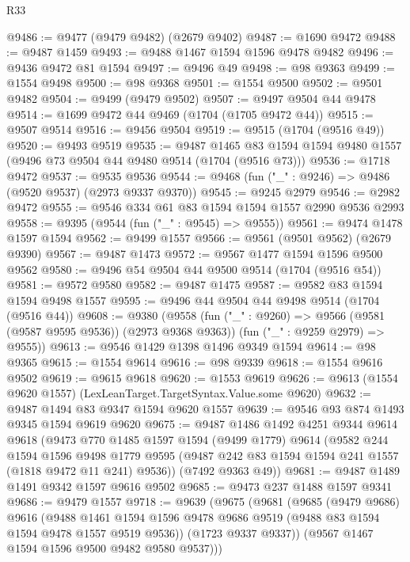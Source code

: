 \begin{lexlean}{R33}
\begin{coremodule}
@9486 := @9477 (@9479 @9482) (@2679 @9402)
@9487 := @1690 @9472
@9488 := @9487 @1459
@9493 := @9488 @1467 @1594 @1596 @9478 @9482
@9496 := @9436 @9472 @81 @1594
@9497 := @9496 @49
@9498 := @98 @9363
@9499 := @1554 @9498
@9500 := @98 @9368
@9501 := @1554 @9500
@9502 := @9501 @9482
@9504 := @9499 (@9479 @9502)
@9507 := @9497 @9504 @44 @9478
@9514 := @1699 @9472 @44 @9469 (@1704 (@1705 @9472 @44))
@9515 := @9507 @9514
@9516 := @9456 @9504
@9519 := @9515 (@1704 (@9516 @49))
@9520 := @9493 @9519
@9535 := @9487
    @1465
    @83
    @1594
    @1594
    @9480
    @1557
    (@9496 @73 @9504 @44 @9480 @9514 (@1704 (@9516 @73)))
@9536 := @1718 @9472
@9537 := @9535 @9536
@9544 := @9468 (fun ("_" : @9246) => @9486 (@9520 @9537) (@2973 @9337 @9370))
@9545 := @9245 @2979
@9546 := @2982 @9472
@9555 := @9546 @334 @61 @83 @1594 @1594 @1557 @2990 @9536 @2993
@9558 := @9395 (@9544 (fun ("_" : @9545) => @9555))
@9561 := @9474 @1478 @1597 @1594
@9562 := @9499 @1557
@9566 := @9561 (@9501 @9562) (@2679 @9390)
@9567 := @9487 @1473
@9572 := @9567 @1477 @1594 @1596 @9500 @9562
@9580 := @9496 @54 @9504 @44 @9500 @9514 (@1704 (@9516 @54))
@9581 := @9572 @9580
@9582 := @9487 @1475
@9587 := @9582 @83 @1594 @1594 @9498 @1557
@9595 := @9496 @44 @9504 @44 @9498 @9514 (@1704 (@9516 @44))
@9608 := @9380
    (@9558
      (fun ("_" : @9260) => @9566 (@9581 (@9587 @9595 @9536)) (@2973 @9368 @9363))
      (fun ("_" : @9259 @2979) => @9555))
@9613 := @9546 @1429 @1398 @1496 @9349 @1594
@9614 := @98 @9365
@9615 := @1554 @9614
@9616 := @98 @9339
@9618 := @1554 @9616 @9502
@9619 := @9615 @9618
@9620 := @1553 @9619
@9626 := @9613 (@1554 @9620 @1557) (LexLeanTarget.TargetSyntax.Value.some @9620)
@9632 := @9487 @1494 @83 @9347 @1594 @9620 @1557
@9639 := @9546 @93 @874 @1493 @9345 @1594 @9619 @9620
@9675 := @9487
    @1486
    @1492
    @4251
    @9344
    @9614
    @9618
    (@9473
      @770
      @1485
      @1597
      @1594
      (@9499 @1779)
      @9614
      (@9582
        @244
        @1594
        @1596
        @9498
        @1779
        @9595
        (@9487 @242 @83 @1594 @1594 @241 @1557 (@1818 @9472 @11 @241) @9536))
      (@7492 @9363 @49))
@9681 := @9487 @1489 @1491 @9342 @1597 @9616 @9502
@9685 := @9473 @237 @1488 @1597 @9341
@9686 := @9479 @1557
@9718 := @9639
    (@9675
      (@9681
        (@9685
          (@9479 @9686)
          @9616
          (@9488
            @1461
            @1594
            @1596
            @9478
            @9686
            @9519
            (@9488 @83 @1594 @1594 @9478 @1557 @9519 @9536))
          (@1723 @9337 @9337))
        (@9567 @1467 @1594 @1596 @9500 @9482 @9580 @9537)))

\end{coremodule}
\end{lexlean}
